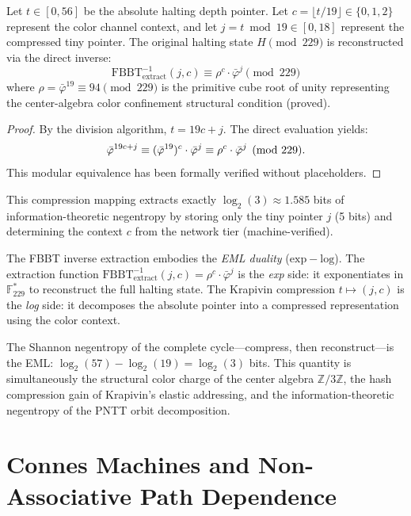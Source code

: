 \begin{theorem}
\label{thm:fbbt_inverse_extract}
Let $t \in [0, 56]$ be the absolute halting depth pointer. Let $c = \lfloor t / 19 \rfloor \in \{0, 1, 2\}$ represent the color channel context, and let $j = t \bmod 19 \in [0, 18]$ represent the compressed tiny pointer. The original halting state $H \pmod{229}$ is reconstructed via the direct inverse:
\[
\mathrm{FBBT}^{-1}_{\mathrm{extract}}(j, c) \equiv \rho^c \cdot \bar\varphi^j \pmod{229}
\]
where $\rho = \bar\varphi^{19} \equiv 94 \pmod{229}$ is the primitive cube root of unity representing the center-algebra color confinement structural condition (proved).
\end{theorem}

\begin{proof}
By the division algorithm, $t = 19c + j$. The direct evaluation yields:
\[
\bar\varphi^{19c + j} \equiv (\bar\varphi^{19})^c \cdot \bar\varphi^j \equiv \rho^c \cdot \bar\varphi^j \pmod{229}. \qedhere
\]
This modular equivalence has been formally verified without placeholders.
\end{proof}

This compression mapping extracts exactly $\log_2(3) \approx 1.585$ bits of information-theoretic negentropy by storing only the tiny pointer $j$ (5 bits) and determining the context $c$ from the network tier (machine-verified).

\begin{remark}
The FBBT inverse extraction embodies the \emph{EML duality} ($\mathrm{exp} - \mathrm{log}$). The extraction function $\mathrm{FBBT}^{-1}_{\mathrm{extract}}(j, c) = \rho^c \cdot \bar\varphi^j$ is the \emph{exp} side: it exponentiates in $\mathbb{F}_{229}^*$ to reconstruct the full halting state. The Krapivin compression $t \mapsto (j, c)$ is the \emph{log} side: it decomposes the absolute pointer into a compressed representation using the color context.

The Shannon negentropy of the complete cycle---compress, then reconstruct---is the EML: $\log_2(57) - \log_2(19) = \log_2(3)$ bits. This quantity is simultaneously the structural color charge of the center algebra $\mathbb{Z}/3\mathbb{Z}$, the hash compression gain of Krapivin's elastic addressing, and the information-theoretic negentropy of the PNTT orbit decomposition.
\end{remark}

\section{Connes Machines and Non-Associative Path Dependence}
\label{sec:connes}

